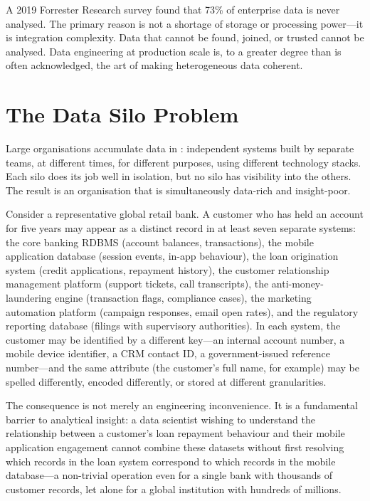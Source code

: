 A 2019 Forrester Research survey found that 73\% of enterprise data is
never analysed. The primary reason is not a shortage of storage or
processing power---it is integration complexity. Data that cannot be
found, joined, or trusted cannot be analysed. Data engineering at
production scale is, to a greater degree than is often acknowledged, the
art of making heterogeneous data coherent.

\section{The Data Silo Problem}
\label{sec:silos}

Large organisations accumulate data in : independent
systems built by separate teams, at different times, for different
purposes, using different technology stacks. Each silo does its job
well in isolation, but no silo has visibility into the others. The
result is an organisation that is simultaneously data-rich and
insight-poor.

Consider a representative global retail bank. A customer who has held
an account for five years may appear as a distinct record in at least
seven separate systems: the core banking RDBMS (account balances,
transactions), the mobile application database (session events,
in-app behaviour), the loan origination system (credit applications,
repayment history), the customer relationship management platform
(support tickets, call transcripts), the anti-money-laundering engine
(transaction flags, compliance cases), the marketing automation
platform (campaign responses, email open rates), and the regulatory
reporting database (filings with supervisory authorities). In each
system, the customer may be identified by a different key---an internal
account number, a mobile device identifier, a CRM contact ID, a
government-issued reference number---and the same attribute (the
customer's full name, for example) may be spelled differently, encoded
differently, or stored at different granularities.

The consequence is not merely an engineering inconvenience. It is a
fundamental barrier to analytical insight: a data scientist wishing to
understand the relationship between a customer's loan repayment
behaviour and their mobile application engagement cannot combine
these datasets without first resolving which records in the loan system
correspond to which records in the mobile database---a non-trivial
operation even for a single bank with thousands of customer
records, let alone for a global institution with hundreds of millions.

